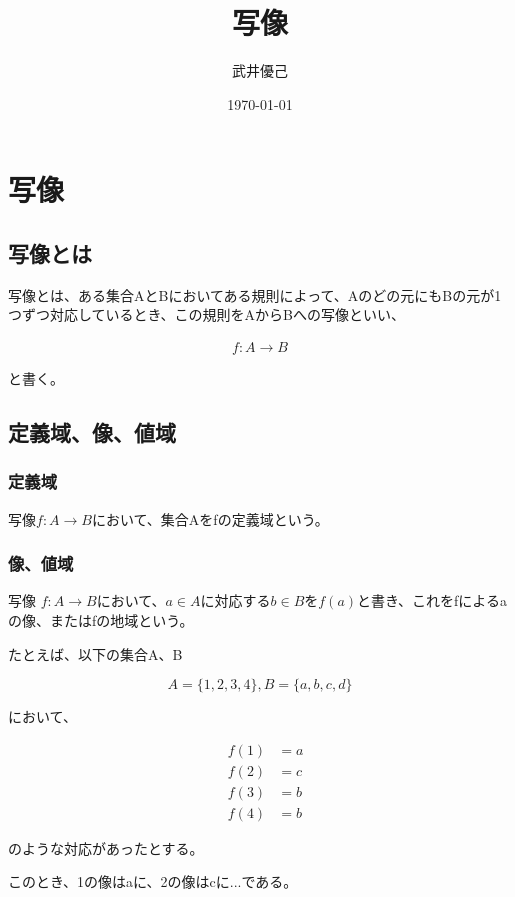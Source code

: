 \documentclass[dvipdfmx,autodetect-engine]{jsarticle}
\title{写像}
\author{武井優己}
\date{\today}
\begin{document}
\maketitle
\section{写像}

\subsection{写像とは}

写像とは、ある集合AとBにおいてある規則によって、Aのどの元にもBの元が1つずつ対応しているとき、この規則をAからBへの写像といい、

\begin{eqnarray}
f: A \to B
\label{eq:mapDef}
\end{eqnarray}

と書く。

\subsection{定義域、像、値域}

\subsubsection[a]{定義域}

写像$f: A \to B$において、集合Aをfの定義域という。

\subsubsection{像、値域}

写像 $f: A \to B$において、$a \in A$に対応する$b \in B$を$f(a)$と書き、これをfによるaの像、またはfの地域という。

たとえば、以下の集合A、B


$$
A = \{ 1, 2, 3, 4 \}, B = \{ a, b, c, d\}
$$

において、

\begin{eqnarray*}
&f(1) &= a \\
&f(2) &= c \\
&f(3) &= b \\
&f(4) &= b
\label{eq:mapDef2}
\end{eqnarray*}

のような対応があったとする。

このとき、1の像はaに、2の像はcに...である。
\end{document}
